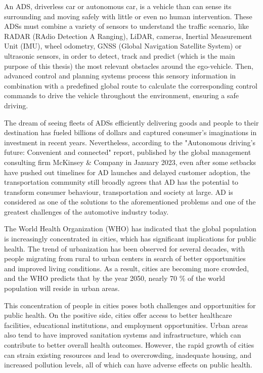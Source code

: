 An \ac{ADS}, driverless car or autonomous car, is a vehicle than can sense its surrounding and moving safely with little or even no human intervention. These \acp{ADS} must combine a variety of sensors to understand the traffic scenario, like RADAR (RAdio Detection A Ranging), \ac{LiDAR}, cameras, Inertial Measurement Unit (IMU), wheel odometry, GNSS (Global Navigation Satellite System) or ultrasonic sensors, in order to detect, track and predict (which is the main purpose of this thesis) the most relevant obstacles around the ego-vehicle. Then, advanced control and planning systems process this sensory information in combination with a predefined global route to calculate the corresponding control commands to drive the vehicle throughout the environment, ensuring a safe driving. 

The dream of seeing fleets of \acp{ADS} efficiently delivering goods and people to their destination has fueled billions of dollars and captured consumer's imaginations in investment in recent years. Nevertheless, according to the "Autonomous driving's future: Convenient and connected" report, published by the global management consulting firm McKinsey \& Company in January 2023, even after some setbacks have pushed out timelines for \ac{AD} launches and delayed customer adoption, the transportation community still broadly agrees that \ac{AD} has the potential to transform consumer behaviour, transportation and society at large. \ac{AD} is considered as one of the solutions to the aforementioned problems and one of the greatest challenges of the automotive industry today. 

The World Health Organization (WHO) has indicated that the global population is increasingly concentrated in cities, which has significant implications for public health. The trend of urbanization has been observed for several decades, with people migrating from rural to urban centers in search of better opportunities and improved living conditions. As a result, cities are becoming more crowded, and the WHO predicts that by the year 2050, nearly 70 \% of the world population will reside in urban areas.

This concentration of people in cities poses both challenges and opportunities for public health. On the positive side, cities offer access to better healthcare facilities, educational institutions, and employment opportunities. Urban areas also tend to have improved sanitation systems and infrastructure, which can contribute to better overall health outcomes. However, the rapid growth of cities can strain existing resources and lead to overcrowding, inadequate housing, and increased pollution levels, all of which can have adverse effects on public health.

